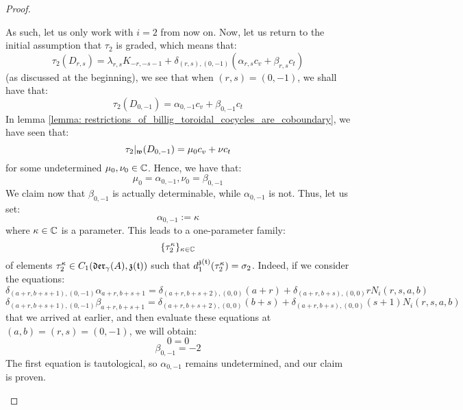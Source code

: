 \begin{proof}
\begin{itemize}
                    As such, let us only work with $i = 2$ from now on. Now, let us return to the initial assumption that $\tau_2$ is graded, which means that:
                        $$\tau_2(D_{r, s}) = \lambda_{r, s} K_{-r, -s - 1} + \delta_{(r, s), (0, -1)} ( \alpha_{r, s} c_v + \beta_{r, s} c_t )$$
                    (as discussed at the beginning), we see that when $(r, s) = (0, -1)$, we shall have that:
                        $$\tau_2(D_{0, -1}) = \alpha_{0, -1} c_v + \beta_{0, -1} c_t$$
                    In lemma \ref{lemma: restrictions_of_billig_toroidal_cocycles_are_coboundary}, we have seen that:
                        $$\tau_2|_{\mathfrak{w}}(D_{0, -1}) = \mu_0 c_v + \nu c_t$$
                    for some undetermined $\mu_0, \nu_0 \in \mathbb{C}$. Hence, we have that:
                        $$\mu_0 = \alpha_{0, -1}, \nu_0 = \beta_{0, -1}$$
                    We claim now that $\beta_{0, -1}$ is actually determinable, while $\alpha_{0, -1}$ is not. Thus, let us set:
                        $$\alpha_{0, -1} := \kappa$$
                    where $\kappa \in \mathbb{C}$ is a parameter. This leads to a one-parameter family:
                        $$\{\tau_2^{\kappa}\}_{\kappa \in \mathbb{C}}$$
                    of elements $\tau_2^{\kappa} \in C_1(\mathfrak{der}_{\gamma}(A), \mathfrak{z}(\mathfrak{t}))$ such that $d_1^{\mathfrak{z}(\mathfrak{t})}(\tau_2^{\kappa}) = \sigma_2$. Indeed, if we consider the equations:
                        $$\delta_{(a + r, b + s + 1), (0, -1)} \alpha_{a + r, b + s + 1} = \delta_{(a + r, b + s + 2), (0, 0)} (a + r) + \delta_{(a + r, b + s), (0, 0)} r N_i(r, s, a, b)$$
                        $$\delta_{(a + r, b + s + 1), (0, -1)} \beta_{a + r, b + s + 1} = \delta_{(a + r, b + s + 2), (0, 0)} (b + s) + \delta_{(a + r, b + s), (0, 0)} (s + 1) N_i(r, s, a, b)$$
                    that we arrived at earlier, and then evaluate these equations at $(a, b) = (r, s) = (0, -1)$, we will obtain:
                        $$0 = 0$$
                        $$\beta_{0, -1} = -2$$
                    The first equation is tautological, so $\alpha_{0, -1}$ remains undetermined, and our claim is proven.


\end{itemize}
\end{proof}
